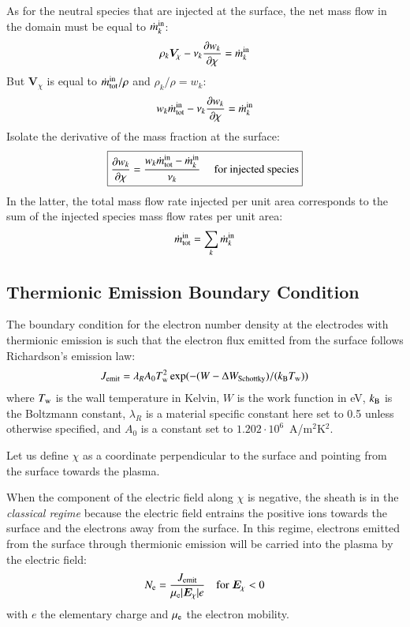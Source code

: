 \documentclass{warpdoc}
\newcommand\frameeqn[1]{\fbox{$\displaystyle #1$}}
\renewcommand{\vec}[1]{\bm{#1}}
\begin{document}
As for the neutral species that are injected at the surface, the net mass flow in the domain must be equal to $\dot{m}^{\rm in}_k$:
%
\begin{equation}
  \rho_k \vec{V}_\chi - \nu_k \frac{\partial w_k}{\partial \chi} =\dot{m}^{\rm in}_k
\end{equation}
%
But $\vec{V}_\chi$ is equal to $\dot{m}^{\rm in}_{\rm tot}/\rho$ and $\rho_k/\rho=w_k$:
%
\begin{equation}
  w_k \dot{m}^{\rm in}_{\rm tot} - \nu_k \frac{\partial w_k}{\partial \chi} =\dot{m}^{\rm in}_k
\end{equation}
%
Isolate the derivative of the mass fraction at the surface:
%
\begin{equation}
\frameeqn{
\frac{\partial w_k}{\partial \chi}=  \frac{w_k \dot{m}^{\rm in}_{\rm tot} - \dot{m}^{\rm in}_k}{ \nu_k }
~~~~~\textrm{for~injected~species}
}
\end{equation}
%
In the latter, the total mass flow rate injected per unit area corresponds to the sum of the injected species mass flow rates per unit area:
%
\begin{equation}
  \dot{m}^{\rm in}_{\rm tot} = \sum_k \dot{m}^{\rm in}_k
\end{equation}
%


\subsection{Thermionic Emission Boundary Condition}


The boundary condition for the electron number density at the electrodes with thermionic emission is such that the electron flux emitted from the surface follows Richardson's emission law:
%
\begin{equation}
    J_{\rm emit}= \lambda_R A_0 T_{\rm w}^2 \exp(-(W-\Delta W_\textrm{Schottky})/(k_{\rm B} T_{\rm w})) 
\end{equation}
%
where $T_{\rm w}$ is the wall temperature in Kelvin, $W$ is the work function in eV, $k_{\rm B}$ is the Boltzmann constant, $\lambda_R$ is a material specific constant here set to 0.5 unless otherwise specified, and $A_0$ is a constant set to $1.202\cdot10^6$~A/m$^2$K$^2$. 

Let us define $\chi$ as a coordinate perpendicular to the surface and pointing from the surface towards the plasma. 

When the component of the electric field along $\chi$ is negative, the sheath is in the \emph{classical regime} because the electric field entrains the positive ions towards the surface and the electrons  away from the surface. In this regime, electrons emitted from the surface through thermionic emission will be carried into the plasma by the electric field:
%
\begin{equation}
 N_{\rm e} = \frac{J_{\rm emit}}{\mu_{\rm e} |\vec{E}_\chi| e} ~~~~{\rm for~}\vec{E}_\chi<0
\end{equation}
%  
with $e$ the elementary charge and $\mu_{\rm e}$ the electron mobility. 
\end{document}
